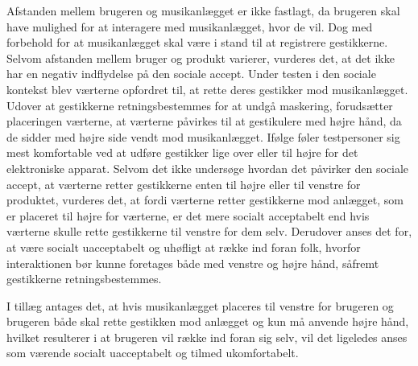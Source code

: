 Afstanden mellem brugeren og musikanlægget er ikke fastlagt, da brugeren skal have mulighed for at interagere med musikanlægget, hvor de vil. Dog med forbehold for at musikanlægget skal være i stand til at registrere gestikkerne. Selvom afstanden mellem bruger og produkt varierer, vurderes det, at det ikke har en negativ indflydelse på den sociale accept.\blankline
%
Under testen i den sociale kontekst blev værterne opfordret til, at rette deres gestikker mod musikanlægget. Udover at gestikkerne retningsbestemmes for at undgå maskering, forudsætter placeringen værterne, at værterne påvirkes til at gestikulere med højre hånd, da de sidder med højre side vendt mod musikanlægget. Ifølge \textcite[s. 197]{PDF:AreYouComfortableDoingThat} føler testpersoner sig mest komfortable ved at udføre gestikker lige over eller til højre for det elektroniske apparat. Selvom det ikke undersøge hvordan det påvirker den sociale accept, at værterne retter gestikkerne enten til højre eller til venstre for produktet, vurderes det, at fordi værterne retter gestikkerne mod anlægget, som er placeret til højre for værterne, er det mere socialt acceptabelt end hvis værterne skulle rette gestikkerne til venstre for dem selv. Derudover anses det for, at være socialt uacceptabelt og uhøfligt at række ind foran folk, hvorfor interaktionen bør kunne foretages både med venstre og højre hånd, såfremt gestikkerne retningsbestemmes. 

I tillæg antages det, at hvis musikanlægget placeres til venstre for brugeren og brugeren både skal rette gestikken mod anlægget og kun må anvende højre hånd, hvilket resulterer i at brugeren vil række ind foran sig selv, vil det ligeledes anses som værende socialt uacceptabelt og tilmed ukomfortabelt. 